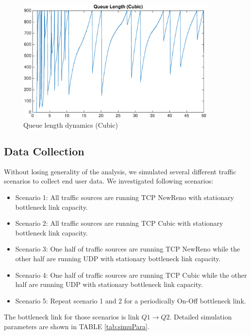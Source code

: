 \begin{figure}
\centering
\includegraphics[width=10cm]{QueueLengthCubic.eps}
\caption{Queue length dynamics (Cubic)}
\label{queuelengthCubic}
\end{figure}


\subsection{Data Collection}
Without losing generality of the analysis, we simulated several different traffic scenarios to collect end user data. We investigated following scenarios: 
\begin{itemize}
    \item Scenario 1: All traffic sources are running TCP NewReno with stationary bottleneck link capacity.
    \item Scenario 2: All traffic sources are running TCP Cubic with stationary bottleneck link capacity.
    \item Scenario 3: One half of traffic sources are running TCP NewReno while the other half are running UDP with stationary bottleneck link capacity.
    \item Scenario 4: One half of traffic sources are running TCP Cubic while the other half are running UDP with stationary bottleneck link capacity.
    \item Scenario 5: Repeat scenario 1 and 2 for a periodically On-Off bottleneck link.
\end{itemize}
The bottleneck link for those scenarios is link $Q1 \to Q2$. Detailed simulation parameters are shown in TABLE \ref{tab:simuPara}.

